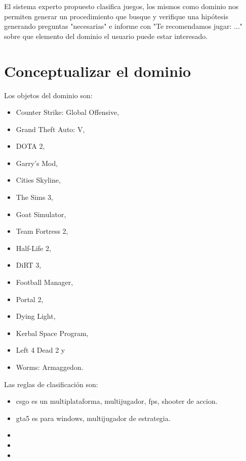 \documentclass[11pt,oneside,a4paper]{article}
\begin{document}
El sistema experto propuesto clasifica juegos, los mismos como 
dominio nos permiten generar un procedimiento que busque y verifique
una hipótesis generando preguntas "necesarias" e informe con          %
"Te recomendamos jugar: ..." sobre que elemento del dominio el
usuario puede estar interesado.


\section{Conceptualizar el dominio}

Los objetos del dominio son:

\begin{multicols}{2}
\begin{itemize}
\item Counter Strike: Global Offensive,
\item Grand Theft Auto: V,
\item DOTA 2,
\item Garry's Mod,
\item Cities Skyline,
\item The Sims 3,
\item Goat Simulator,
\item Team Fortress 2,
\item Half-Life 2,
\item DiRT 3,
\item Football Manager,
\item Portal 2,
\item Dying Light,
\item Kerbal Space Program,
\item Left 4 Dead 2 y
\item Worms: Armaggedon.
\end{itemize}
\end{multicols}

Las reglas de clasificación son:

\begin{itemize}
  \item csgo es un multiplataforma, multijugador, fps, shooter de accion. 
  \item gta5 es para windows, multijugador de estrategia.
  \item 
  \item 
  \item 
\end{itemize}
\end{document}
